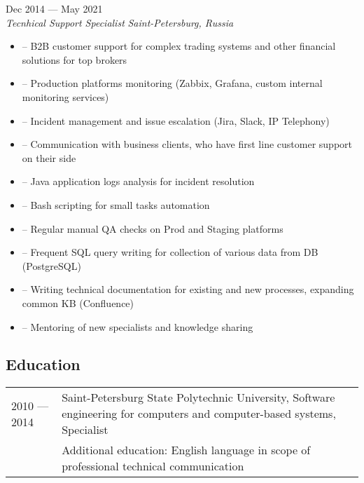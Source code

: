 \documentclass[10pt]{report}
\newenvironment{JobDescription}[5]{
    \vspace{ #5 }
    \flushleft
    {\bf #1 } \hfill { #2 }
    \\
    {\em #3 } \hfill {\em #4 }
    \begin{itemize}
} {
    \end{itemize}
}
\begin{document}
\begin{JobDescription}{}{Dec 2014 --- May 2021}{Tecnhical Support Specialist}{Saint-Petersburg, Russia}{0mm}
  \item[--] B2B customer support for complex trading systems and other financial solutions for top brokers
  \item[--] Production platforms monitoring (Zabbix, Grafana, custom internal monitoring  services)
  \item[--] Incident management and issue escalation (Jira, Slack, IP Telephony)
  \item[--] Communication with business clients, who have first line customer support on their side
  \item[--] Java application logs analysis for incident resolution
  \item[--] Bash scripting for small tasks automation
  \item[--] Regular manual QA checks on Prod and Staging platforms
  \item[--] Frequent SQL query writing for collection of various data from DB (PostgreSQL)
  \item[--] Writing technical documentation for existing and new processes, expanding common KB (Confluence)
  \item[--] Mentoring of new specialists and knowledge sharing
\end{JobDescription}

\goodbreak

\subsection*{Education}
\begin{table}[H]
  \begin{tabular}{@{}p{}p{}}
    2010 --- 2014 & Saint-Petersburg State Polytechnic University, Software engineering for computers and computer-based systems, Specialist \\
                  & Additional education: English language in scope of professional technical communication
  \end{tabular}
\end{table}

\goodbreak
\end{document}
